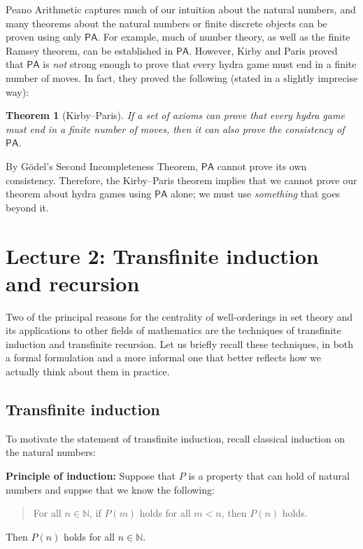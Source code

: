 \documentclass[a4paper]{memoir}
\newtheorem{theorem}{Theorem}[section]
\theoremstyle{definition}
\begin{document}
Peano Arithmetic captures much of our intuition about the natural numbers, and many theorems 
about the natural numbers or finite discrete objects can be proven using only $\mathsf{PA}$. For 
example, much of number theory, as well as the finite Ramsey theorem, can be established in 
$\mathsf{PA}$. However, Kirby and Paris proved that $\mathsf{PA}$ is \emph{not} strong enough 
to prove that every hydra game must end in a finite number of moves. In fact, they proved the 
following (stated in a slightly imprecise way):

\begin{theorem}[Kirby--Paris]
  If a set of axioms can prove that every hydra game must end in a finite number of moves, 
  then it can also prove the consistency of $\mathsf{PA}$.
\end{theorem}

By G\"{o}del's Second Incompleteness Theorem, $\mathsf{PA}$ cannot prove its own consistency. 
Therefore, the Kirby--Paris theorem implies that we cannot prove our theorem about hydra games 
using $\mathsf{PA}$ alone; we must use \emph{something} that goes beyond it.

\chapter{Lecture 2: Transfinite induction and recursion}

Two of the principal reasons for the centrality of well-orderings in set theory and its 
applications to other fields of mathematics are the techniques of transfinite induction 
and transfinite recursion. Let us briefly recall these techniques, in both a formal 
formulation and a more informal one that better reflects how we actually think about them in 
practice.

\section{Transfinite induction}

To motivate the statement of transfinite induction, recall classical induction on the natural numbers:

\textbf{Principle of induction:} Suppose that $P$ is a property that can hold of natural numbers and 
suppse that we know the following:
\begin{quote}
  For all $n \in \mathbb{N}$, if $P(m)$ holds for all $m < n$, then $P(n)$ holds.
\end{quote}
Then $P(n)$ holds for all $n \in \mathbb{N}$.
\end{document}
